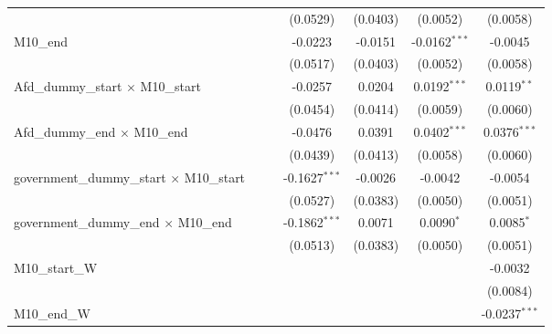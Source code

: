 \documentclass[10pt,a4paper]{article}
\begin{document}
\begin{tabular}{lcccccc}
                                                    &                &                & (0.0529)        & (0.0403)       & (0.0052)        & (0.0058)\\   
   M10\_end                                         &                &                & -0.0223         & -0.0151        & -0.0162$^{***}$ & -0.0045\\   
                                                    &                &                & (0.0517)        & (0.0403)       & (0.0052)        & (0.0058)\\   
   Afd\_dummy\_start $\times$ M10\_start            &                &                & -0.0257         & 0.0204         & 0.0192$^{***}$  & 0.0119$^{**}$\\   
                                                    &                &                & (0.0454)        & (0.0414)       & (0.0059)        & (0.0060)\\   
   Afd\_dummy\_end $\times$ M10\_end                &                &                & -0.0476         & 0.0391         & 0.0402$^{***}$  & 0.0376$^{***}$\\   
                                                    &                &                & (0.0439)        & (0.0413)       & (0.0058)        & (0.0060)\\   
   government\_dummy\_start $\times$ M10\_start     &                &                & -0.1627$^{***}$ & -0.0026        & -0.0042         & -0.0054\\   
                                                    &                &                & (0.0527)        & (0.0383)       & (0.0050)        & (0.0051)\\   
   government\_dummy\_end $\times$ M10\_end         &                &                & -0.1862$^{***}$ & 0.0071         & 0.0090$^{*}$    & 0.0085$^{*}$\\   
                                                    &                &                & (0.0513)        & (0.0383)       & (0.0050)        & (0.0051)\\   
   M10\_start\_W                                    &                &                &                 &                &                 & -0.0032\\   
                                                    &                &                &                 &                &                 & (0.0084)\\   
   M10\_end\_W                                      &                &                &                 &                &                 & -0.0237$^{***}$\\   

\end{tabular}
\end{document}
